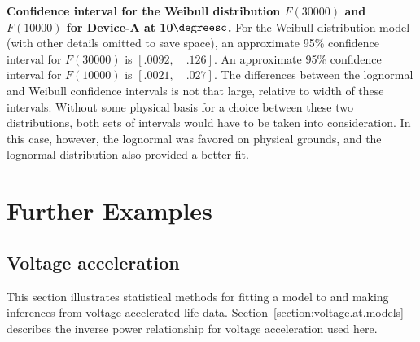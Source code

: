\begin{example}
{\bf Confidence interval for the Weibull distribution $F(30000)$ and
$F(10000)$ for Device-A at 10$\degreesc$.} For the Weibull
distribution model (with other details omitted to save space), an
approximate 95\% confidence interval for $F(30000)$ is $[.0092,\quad
.126]$.  An approximate 95\% confidence interval for $F(10000)$ is
$[.0021,\quad.027]$.  The differences between the lognormal and
Weibull confidence intervals is not that large, relative to width of
these intervals.  Without some physical basis for a choice between
these two distributions, both sets of intervals would have to be
taken into consideration.  In this case, however, the lognormal was
favored on physical grounds, and the lognormal distribution also
provided a better fit.
\end{example}


\section{Further Examples}
\label{section:further.examp.alt}
\subsection{Voltage acceleration}
\label{section:volt.alt}
This section illustrates statistical methods for fitting a model to
and making inferences from voltage-accelerated life data.
Section~\ref{section:voltage.at.models} describes the inverse power
relationship for voltage acceleration used here.

